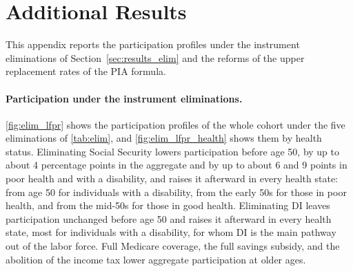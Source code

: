 \section{Additional Results}\label{app:figures}

This appendix reports the participation profiles under the instrument eliminations of Section~\ref{sec:results_elim} and the reforms of the upper replacement rates of the PIA formula.

\paragraph{Participation under the instrument eliminations.} \autoref{fig:elim_lfpr} shows the participation profiles of the whole cohort under the five eliminations of \autoref{tab:elim}, and \autoref{fig:elim_lfpr_health} shows them by health status. Eliminating Social Security lowers participation before age 50, by up to about 4 percentage points in the aggregate and by up to about 6 and 9 points in poor health and with a disability, and raises it afterward in every health state: from age 50 for individuals with a disability, from the early 50s for those in poor health, and from the mid-50s for those in good health. Eliminating DI leaves participation unchanged before age 50 and raises it afterward in every health state, most for individuals with a disability, for whom DI is the main pathway out of the labor force. Full Medicare coverage, the full savings subsidy, and the abolition of the income tax lower aggregate participation at older ages.

